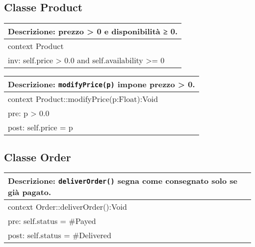 \subsection{Classe Product}

\begin{table}[H]
  \centering
  \begin{tabular}{p{}}
    \toprule
    \textbf{Descrizione:} prezzo > 0 e disponibilità ≥ 0.\\
    \midrule
    context Product\\
    \quad inv: self.price > 0.0 and self.availability >= 0\\
    \bottomrule
  \end{tabular}
\end{table}

\begin{table}[H]
  \centering
  \begin{tabular}{p{}}
    \toprule
    \textbf{Descrizione:} \texttt{modifyPrice(p)} impone prezzo > 0.\\
    \midrule
    context Product::modifyPrice(p:Float):Void\\
    \quad pre: p > 0.0\\
    \quad post: self.price = p\\
    \bottomrule
  \end{tabular}
\end{table}
\FloatBarrier

\subsection{Classe Order}



\begin{table}[H]
  \centering
  \begin{tabular}{p{}}
    \toprule
    \textbf{Descrizione:} \texttt{deliverOrder()} segna come consegnato solo se già pagato.\\
    \midrule
    context Order::deliverOrder():Void\\
    \quad pre: self.status = \#Payed\\
    \quad post: self.status = \#Delivered\\
    \bottomrule
  \end{tabular}
\end{table}
\FloatBarrier

